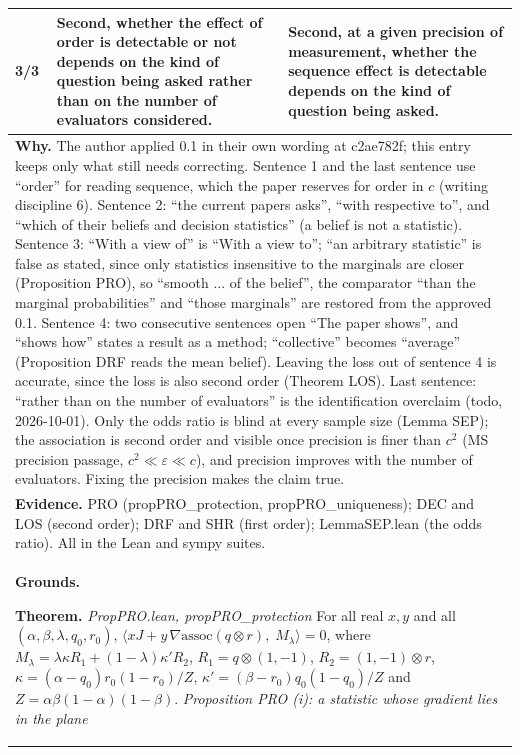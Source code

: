 \documentclass[10pt]{article}
\theoremstyle{definition}
\newlength{\fullw}\setlength{\fullw}{25.9cm}
\begin{document}
{\begin{longtable}{|p{0.9cm}|p{12.2cm}|p{12.2cm}|}
3/3 & Second, whether the effect of order is detectable or not depends on the kind of question being asked rather than on the number of evaluators considered. & Second, at a given precision of measurement, whether the sequence effect is detectable depends on the kind of question being asked. \\ \hline
\multicolumn{3}{|p{\fullw}|}{\textbf{Why.} The author applied 0.1 in their own wording at c2ae782f; this entry keeps only what still needs correcting. Sentence 1 and the last sentence use ``order'' for reading sequence, which the paper reserves for order in $c$ (writing discipline 6). Sentence 2: ``the current papers asks'', ``with respective to'', and ``which of their beliefs and decision statistics'' (a belief is not a statistic). Sentence 3: ``With a view of'' is ``With a view to''; ``an arbitrary statistic'' is false as stated, since only statistics insensitive to the marginals are closer (Proposition PRO), so ``smooth ... of the belief'', the comparator ``than the marginal probabilities'' and ``those marginals'' are restored from the approved 0.1. Sentence 4: two consecutive sentences open ``The paper shows'', and ``shows how'' states a result as a method; ``collective'' becomes ``average'' (Proposition DRF reads the mean belief). Leaving the loss out of sentence 4 is accurate, since the loss is also second order (Theorem LOS). Last sentence: ``rather than on the number of evaluators'' is the identification overclaim (todo, 2026-10-01). Only the odds ratio is blind at every sample size (Lemma SEP); the association is second order and visible once precision is finer than $c^2$ (MS precision passage, $c^2\ll\varepsilon\ll c$), and precision improves with the number of evaluators. Fixing the precision makes the claim true.} \\
\multicolumn{3}{|p{\fullw}|}{\textbf{Evidence.} PRO (propPRO\_protection, propPRO\_uniqueness); DEC and LOS (second order); DRF and SHR (first order); LemmaSEP.lean (the odds ratio). All in the Lean and sympy suites.} \\ \hline
\multicolumn{3}{|p{\fullw}|}{\textbf{Grounds.}\par \textbf{Theorem.} \textit{PropPRO.lean, propPRO\_protection} \newline For all real $x,y$ and all $(\alpha,\beta,\lambda,q_0,r_0)$,
$\langle xJ + y\,\nabla\mathrm{assoc}(q\otimes r),\; M_\lambda\rangle = 0$, where
$M_\lambda = \lambda\kappa R_1 + (1-\lambda)\kappa' R_2$, $R_1 = q\otimes(1,-1)$,
$R_2 = (1,-1)\otimes r$, $\kappa = (\alpha-q_0)r_0(1-r_0)/Z$,
$\kappa' = (\beta-r_0)q_0(1-q_0)/Z$ and $Z = \alpha\beta(1-\alpha)(1-\beta)$. \newline \textit{Proposition PRO (i): a statistic whose gradient lies in the plane
}}
\end{longtable}}
\end{document}
